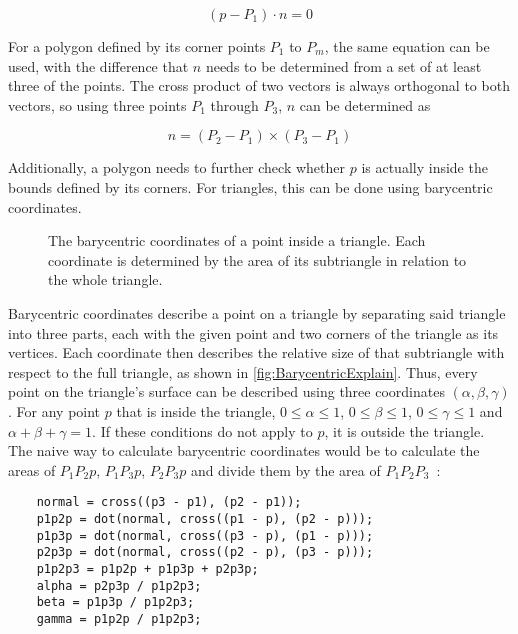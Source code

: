 \begin{equation}\label{StaticSurface}
    (p - P_1) \cdot n = 0
\end{equation}

For a polygon defined by its corner points \(P_{1}\) to \(P_{m}\), the same equation can be used,
with the difference that \(n\) needs to be determined from a set of at least three of the points.
The cross product of two vectors is always orthogonal to both vectors, so using three points \(P_{1}\) through \(P_{3}\),
\(n\) can be determined as

\begin{equation}\label{PolygonNormal}
    n = (P_{2} - P_{1}) \times (P_{3} - P_{1})
\end{equation}

Additionally, a polygon needs to further check whether \(p\) is actually inside the bounds defined by its corners.
For triangles, this can be done using barycentric coordinates.
\newline
\begin{figure}[t!]
    \begin{center}
    
    \end{center}
    \caption[Visualization of barycentric coordinates]{The barycentric coordinates of a point inside a triangle. Each coordinate is determined by the area of its subtriangle in relation to the whole triangle.}\label{fig:BarycentricExplain}
\end{figure}
Barycentric coordinates describe a point on a triangle by separating said triangle into three parts,
each with the given point and two corners of the triangle as its vertices.
Each coordinate then describes the relative size of that subtriangle with respect to the full triangle,
as shown in \autoref{fig:BarycentricExplain}.
\newline
Thus, every point on the triangle's surface can be described using three coordinates \((\alpha, \beta, \gamma)\).
For any point \(p\) that is inside the triangle,
\(0 \le \alpha \le 1\), \(0 \le \beta \le 1\), \(0 \le \gamma \le 1\) and \(\alpha + \beta + \gamma = 1\).
If these conditions do not apply to \(p\), it is outside the triangle.
\newline
The naive way to calculate barycentric coordinates would be to calculate the areas of \(P_1P_2p\), \(P_1P_3p\), \(P_2P_3p\) and
divide them by the area of \(P_1P_2P_3\)~\cite{SM09}:
\begin{verbatim}
    normal = cross((p3 - p1), (p2 - p1));
    p1p2p = dot(normal, cross((p1 - p), (p2 - p)));
    p1p3p = dot(normal, cross((p3 - p), (p1 - p)));
    p2p3p = dot(normal, cross((p2 - p), (p3 - p)));
    p1p2p3 = p1p2p + p1p3p + p2p3p;
    alpha = p2p3p / p1p2p3;
    beta = p1p3p / p1p2p3;
    gamma = p1p2p / p1p2p3;
\end{verbatim}
